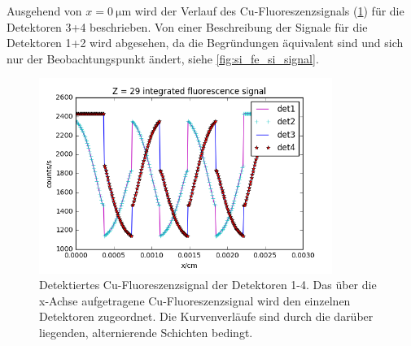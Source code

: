 Ausgehend von $x=\SI{0}{\micro\meter}$ wird der Verlauf des Cu-Fluoreszenzsignals (\cref{fig:cu_fe_cu_signal}) für die Detektoren 3+4 beschrieben. Von einer Beschreibung der Signale für die Detektoren 1+2 wird abgesehen, da die Begründungen äquivalent sind und sich nur der Beobachtungspunkt ändert, siehe \cref{fig:si_fe_si_signal}.

\begin{figure}[H] 
  \centering
     \includegraphics[width=0.85\textwidth]{illustrations/cu_fe_cu_signal.png}
  \caption[Simuliertes Kupfersignal über Kupferkante]{Detektiertes Cu-Fluoreszenzsignal der Detektoren 1-4. Das über die x-Achse aufgetragene Cu-Fluoreszenzsignal wird den einzelnen Detektoren zugeordnet. Die Kurvenverläufe sind durch die darüber liegenden, alternierende Schichten bedingt.}
  \label{fig:cu_fe_cu_signal}
\end{figure}

